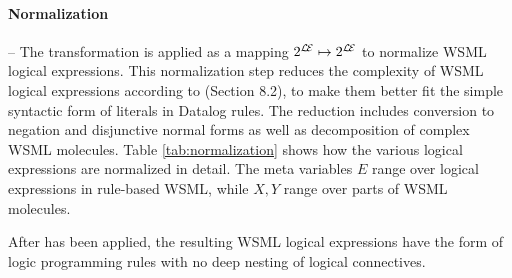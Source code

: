 \paragraph{Normalization} -- The transformation \transnorm is
applied as a mapping $2^{\mathcal{L\!E}} \mapsto 2^{\mathcal{L\!E}}$ to
normalize WSML logical expressions. This normalization step
reduces the complexity of WSML logical expressions according to
\cite{wsml-spec}(Section 8.2), to make them better fit the simple
syntactic form of literals in Datalog rules. The reduction
includes conversion to negation and disjunctive normal forms as
well as decomposition of complex WSML molecules. Table
\ref{tab:normalization} shows how the various logical expressions
are normalized in detail. The meta variables $E$ range over
logical expressions in rule-based WSML, while $X,Y$ range over
parts of WSML molecules.

After \transnorm has been applied, the resulting WSML logical
expressions have the form of logic programming rules with no deep
nesting of logical connectives.

